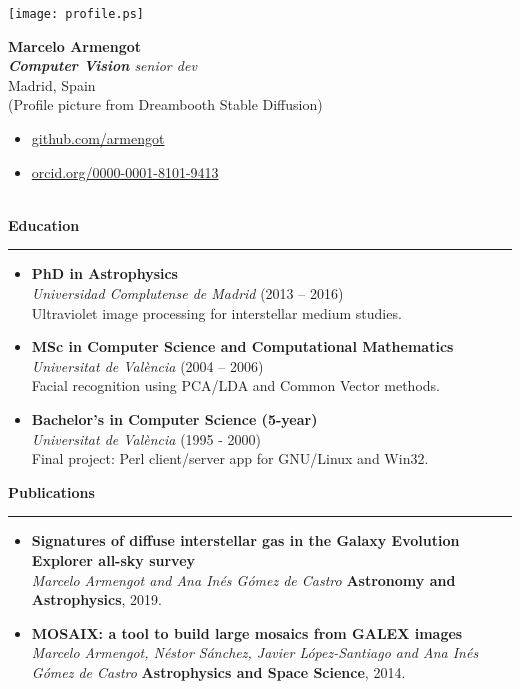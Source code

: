 \documentclass[10pt,a4paper]{article}
\newcommand{\sect}[1]{\vspace{6pt}\noindent\textbf{\large #1}\vspace{2pt}\hrule\vspace{6pt}}
\newcommand{\subsect}[1]{\vspace{4pt}\textbf{#1}}
\begin{document}
\pagestyle{empty}

\begin{center}
\begin{minipage}[c]{0.25\textwidth}
    \texttt{[image: profile.ps]}
\end{minipage}
\hfill
\begin{minipage}[c]{0.7\textwidth}
    {\LARGE \textbf{Marcelo Armengot}} \\[4pt]
    \textit{\textbf{Computer Vision} senior dev} \\[4pt]
    Madrid, Spain \\[4pt]
    (Profile picture from Dreambooth Stable Diffusion) \\
    \begin{itemize}[leftmargin=*,label={}]
      \item \href{https://github.com/armengot}{github.com/armengot}
      \item \href{https://orcid.org/0000-0001-8101-9413}{orcid.org/0000-0001-8101-9413}
    \end{itemize}
\end{minipage}
\end{center}

~\\

\sect{Education}
\begin{itemize}[leftmargin=*]
  \item \subsect{PhD in Astrophysics}\\
    \textit{Universidad Complutense de Madrid} (2013 – 2016) \\
    Ultraviolet image processing for interstellar medium studies.

  \item \subsect{MSc in Computer Science and Computational Mathematics}\\
    \textit{Universitat de València} (2004 – 2006) \\
    Facial recognition using PCA/LDA and Common Vector methods.

  \item \subsect{Bachelor's in Computer Science (5-year)}\\
    \textit{Universitat de València} (1995 - 2000) \\
    Final project: Perl client/server app for GNU/Linux and Win32.
\end{itemize}

\sect{Publications}
\begin{itemize}[leftmargin=*]
    \item \textbf{Signatures of diffuse interstellar gas in the Galaxy Evolution Explorer all-sky survey} \\
    \textit{Marcelo Armengot and Ana Inés Gómez de Castro} \textbf{Astronomy and Astrophysics}, 2019.
    
    \item \textbf{MOSAIX: a tool to build large mosaics from GALEX images} \\
    \textit{Marcelo Armengot, Néstor Sánchez, Javier López-Santiago and Ana Inés Gómez de Castro} \textbf{Astrophysics and Space Science}, 2014.
\end{itemize}
\end{document}
